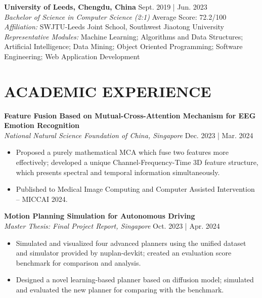 \documentclass[a4paper,9pt]{extarticle}
\begin{document}
\noindent
\textbf{University of Leeds, Chengdu, China} \hfill Sept. 2019 | Jun. 2023 \\ %
\textit{Bachelor of Science in Computer Science (2:1)}  \hfill Average Score: 72.2/100 \\ %
\textit{Affiliation:} SWJTU-Leeds Joint School, Southwest Jiaotong University \\
\textit{Representative Modules:} Machine Learning; Algorithms and Data Structures; Artificial Intelligence; Data Mining; Object Oriented Programming; Software Engineering; Web Application Development

\nocite{*}



\section*{ACADEMIC EXPERIENCE}

\noindent
\textbf{Feature Fusion Based on Mutual-Cross-Attention Mechanism for EEG Emotion Recognition} \\ %
\textit{National Natural Science Foundation of China, Singapore} \hfill Dec. 2023 | Mar. 2024
\begin{itemize}
    \item Proposed a purely mathematical MCA which fuse two features more effectively; developed a unique Channel-Frequency-Time 3D feature structure, which presents spectral and temporal information simultaneously. 
    \item Published to Medical Image Computing and Computer Assisted Intervention -- MICCAI 2024.
\end{itemize}

\noindent
\textbf{Motion Planning Simulation for Autonomous Driving} \\ %
\textit{Master Thesis: Final Project Report, Singapore} \hfill Oct. 2023 | Apr. 2024 %
\begin{itemize}
    \item Simulated and visualized four advanced planners using the unified dataset and simulator provided by nuplan-devkit; created an evaluation score benchmark for comparison and analysis.
    \item Designed a novel learning-based planner based on diffusion model; simulated and evaluated the new planner for comparing with the benchmark.
\end{itemize}
\end{document}
